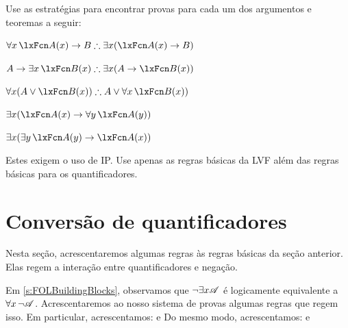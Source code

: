 \problempart
Use as estratégias para encontrar provas para cada um dos argumentos e teoremas a seguir:
\begin{compactlist}
\item $\forall x\,\atom{A}{x} \eif B \therefore \exists x(\atom{A}{x} \eif B)$
\item $A \eif \exists x\, \atom{B}{x} \therefore \exists x(A \eif \atom{B}{x})$
\item $\forall x(A \eor \atom{B}{x}) \therefore A \eor \forall x\,\atom{B}{x})$
\item $\exists x(\atom{A}{x} \eif \forall y\,\atom{A}{y})$
\item $\exists x(\exists y\,\atom{A}{y} \eif \atom{A}{x})$
\end{compactlist}
Estes exigem o uso de IP. Use apenas as regras básicas da LVF além das regras básicas para os quantificadores.

\chapter{Conversão de quantificadores}\label{s:CQ}

Nesta seção, acrescentaremos algumas regras às regras básicas da seção anterior. Elas regem a interação entre quantificadores e negação.

Em \cref{s:FOLBuildingBlocks}, observamos que $\neg\exists x\mathscr{A}$ é logicamente equivalente a $\forall x\,\neg\mathscr{A}$. Acrescentaremos ao nosso sistema de provas algumas regras que regem isso. Em particular, acrescentamos:
e
Do mesmo modo, acrescentamos:
e

